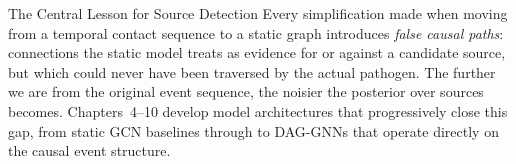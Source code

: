 \begin{keyinsight}{The Central Lesson for Source Detection}
Every simplification made when moving from a temporal contact sequence to a static graph
introduces \textit{false causal paths}: connections the static model treats as evidence for or
against a candidate source, but which could never have been traversed by the actual pathogen.
The further we are from the original event sequence, the noisier the posterior over sources
becomes. Chapters~4--10 develop model architectures that progressively close this gap, from
static GCN baselines through to DAG-GNNs that operate directly on the causal event structure.
\end{keyinsight}
